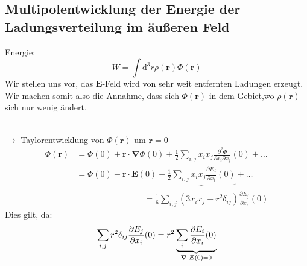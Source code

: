 \documentclass[titlepage,11pt,a4paper,ngerman]{report}
\newcommand{\tx}[1]{\textrm{#1}}
\newcommand{\dd}{\tx{d}}
\renewcommand{\Phi}{\varPhi}
\renewcommand{\vec}[1]{\boldsymbol{#1}}
\begin{document}
\subsection{Multipolentwicklung der Energie der Ladungsverteilung im äußeren Feld}

\begin{minipage}{.6\linewidth}
	Energie:
	\begin{equation}
	W=\int\dd^3r\rho(\vec{r})\Phi(\vec{r})
	\label{W}
	\end{equation}
	Wir stellen uns vor, das $ \vec{E} $-Feld wird von sehr weit entfernten Ladungen erzeugt. Wir machen somit also die Annahme, dass sich $\Phi(\vec{r})$ in dem Gebiet,wo $ \rho(\vec{r}) $ sich nur wenig ändert.
\end{minipage}%
\begin{minipage}{.4\linewidth}
	\centering
\end{minipage}%
\\
$\rightarrow$ Taylorentwicklung von $\Phi(\vec{r})$ um $\vec{r}=0$\\
\begin{align*}
\Phi(\vec{r}) &= \Phi(0) + \vec{r} \cdot \vec{\nabla} \Phi(0) + \frac{1}{2} \sum_{i,j} x_i x_j \frac{\partial^2\Phi}{\partial x_i\partial x_j} (0) + \ldots \\
&= \Phi(0) - \vec{r} \cdot \vec{E} (0) - \underbrace{\frac{1}{2} \sum_{i,j} x_i x_j \frac{\partial E_j}{\partial x_i} (0)}_{} + \ldots\\
& \qquad \qquad \qquad \qquad = \frac{1}{6} \sum_{i,j} (3 x_i x_j - r^2 \delta_{ij}) \frac{\partial E_j}{\partial x_i} (0) 
\end{align*}
Dies gilt, da:
$$\sum_{i,j}r^2\delta_{ij}\frac{\partial E_j}{\partial x_i}(0)=r^2\underbrace{\sum_i\frac{\partial E_i}{\partial x_i}(0)}_{\mathclap{\vec{\nabla}\cdot\vec{E}(0)=0}}$$
\end{document}

